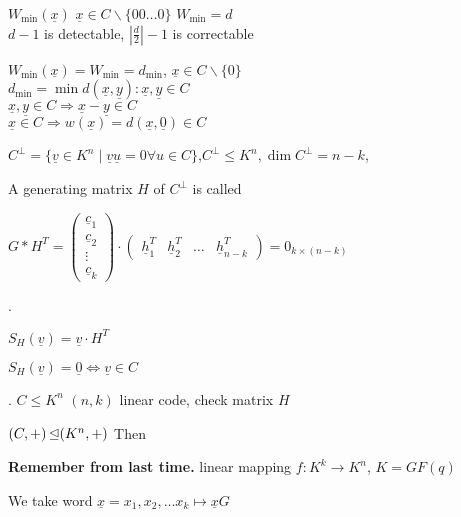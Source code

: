 $W_{\min}(\underline{x})$ $\underline{x} \in C \backslash \{00\ldots 0\}$ $W_{\min} = d$ \\
$d-1$ is detectable, $ \left|\frac{d}{2}\right| -1$ is correctable


$W_{\min}(\underline{x}) = W_{\min} = d_{\min}$, $\underline{x} \in C \backslash \{0\}$ \\
$d_{\min} = \min d( \underline{x},\underline{y}) : \underline{x},\underline{y} \in C$\\
$\underline{x},\underline{y} \in C \Rightarrow \underline{x} - \underline{y} \in C$\\
$\underline{x} \in C \Rightarrow w(\underline{x}) = d(\underline{x},\underline{0}) \in C$\\


\begin{definition}
  $C^\bot = \{ \underline{v} \in K^n \mid \underline{v} \underline{u} = 0 \forall u \in C \}$,$ C^\bot \leq K^n, \dim C^\bot = n-k$,

  A generating matrix $H$ of $C^\bot$ is called 

$G * H^T = \begin{pmatrix}\underline{c}_1\\ \underline{c}_2\\ \vdots \\ \underline{c}_k \end{pmatrix} \cdot \begin{pmatrix}\underline{h}_1^T& \underline{h}_2^T& \ldots & \underline{h}_{n-k}^T \end{pmatrix} = 0_{k\times (n-k)}$
\end{definition}

\Remark.

\begin{definition}
  $S_H(\underline{v}) = \underline{v} \cdot H^T$ 

  $S_H(\underline{v}) = \underline{0} \Leftrightarrow \underline{v} \in C$
\end{definition}

\Theorem.
$C\leq K^n$ $(n,k)$ linear code, check matrix $H$

$(C,+) \operatorname{\trianglelefteq} (K^n, +)$ Then



\textbf{Remember from last time.}
linear mapping $f: K^k \rightarrow K^n$, $K = GF(q)$

We take word $\underline{x} = x_1, x_2, \ldots x_k \mapsto \underline{x} G$

